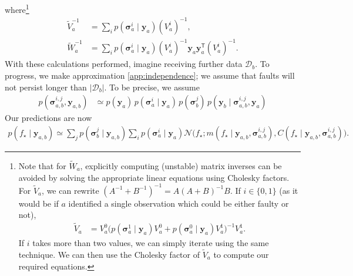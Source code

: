 \documentclass{article} %
\newcommand{\deq}{=}
\newcommand{\given}{\!\ensuremath{\mid}\!}
\newcommand{\cm}[1]{\ensuremath{\mathcal{#1}}}
\newcommand{\bm}[1]{\ensuremath{\mathbf{#1}}}
\newcommand{\data}{\ensuremath{\cm{D}}}
\newcommand{\vect}[1]{\bm{#1}}
\newcommand{\vy}{\vect{y}}
\newcommand{\vs}{\vect{\sigma}}
\newcommand{\p}[2]{p(#1\given#2)}
\newcommand{\fPr}{p}
\newcommand{\Prob}[2]{\fPr(#1 \given #2 )}
\newcommand{\mean}[2]{{m}(#1\given#2)}
\newcommand{\cov}[2]{{C}(#1\given#2)}
\newcommand{\st}{_{\star}}
\newcommand{\tr}{\ensuremath{\mathsf{T}}}
\DeclareMathOperator{\chol}{chol}
\begin{document}
where\footnote{
Note that for $\tilde{W}_a$, explicitly computing (unstable) matrix
inverses can be avoided by solving the appropriate linear equations
using Cholesky factors.  For $\tilde{V}_a$, we can rewrite
$(A^{-1}+B^{-1})^{-1} = A (A+B)^{-1} B$. If $i\in\{0,1\}$ (as it would
be if $a$ identified a single observation which could be either faulty
or not),
\begin{align} \label{eq:inverse_trick}
\tilde{V}_a & = V^0_a\bigl(
\Prob{\vs^1_{a}}{\vy_a} V^0_a 
+ 
\Prob{\vs^0_{a}}{\vy_a} V^1_a
\bigr)^{-1}V^1_a.
\end{align}
If $i$ takes more than two values, we can simply iterate using the
same technique. We can then use the Cholesky factor of $\tilde{V}_a$ to compute our required equations.}
\begin{align}
 \tilde{V}_a^{-1}  & \deq \sum_i \Prob{\vs^i_{a}}{\vy_a} (V_a^i)^{-1},\nonumber\\
 \tilde{W}_a^{-1} & \deq \sum_i \Prob{\vs^i_{a}}{\vy_a} (V_a^i)^{-1}\vy_a \vy_a^\tr (V_a^i)^{-1}.\label{eq:Wa}
\end{align}
With these calculations performed, imagine receiving
further data $\data_b$. To progress, we make approximation \ref{app:independence}; we assume that faults will not persist longer than $|\data_b|$. To be precise, we assume
\begin{align} \label{eq:approx}
p(\vs^{i,j}_{a,b},\vy_{a,b}) & \simeq p(\vy_a)\,\Prob{\vs^i_{a}}{\vy_a}\,
p(\vs^j_{b})\,\p{\vy_b}{\vs^{i,j}_{a,b},\vy_{a}}
\end{align}
Our predictions are now
\begin{align}
\p{f\st}{\vy_{a,b}} %
\simeq 
\sum_{j} \Prob{\vs^j_{b}}{\vy_{a,b}}\sum_{i} \Prob{\vs^i_{a}}{\vy_a} {}
 \cm{N}\bigl(f\st; \mean{f\st}{\vy_{a,b}, \vs^{i,j}_{a,b}}, \cov{f\st}{\vy_{a,b}, \vs^{i,j}_{a,b}}\bigr).\label{eq:sum_o_Gaussians}
\end{align}
\end{document}

